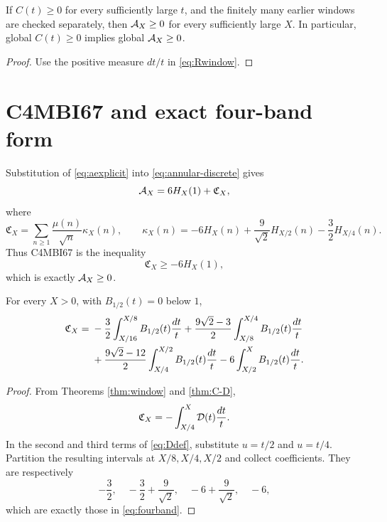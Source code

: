 \begin{corollary}\label{cor:pointwise}
If $C(t)\ge0$ for every sufficiently large $t$, and the finitely many earlier
windows are checked separately, then $\mathcal A_X\ge0$ for every sufficiently large
$X$.  In particular, global $C(t)\ge0$ implies global $\mathcal A_X\ge0$.
\end{corollary}
\begin{proof}
Use the positive measure $dt/t$ in \eqref{eq:Rwindow}.
\end{proof}

\section{C4MBI67 and exact four-band form}

Substitution of \eqref{eq:aexplicit} into \eqref{eq:annular-discrete} gives
\begin{equation}\label{eq:kappa}
 \mathcal A_X=6H_X(1)+\mathfrak C_X,
\end{equation}
where
\[
 \mathfrak C_X=\sum_{n\ge1}\frac{\mu(n)}{\sqrt n}\kappa_X(n),
\qquad
 \kappa_X(n)=-6H_X(n)+\frac9{\sqrt2}H_{X/2}(n)
                         -\frac32H_{X/4}(n).
\]
Thus C4MBI67 is the inequality
\begin{equation}\label{eq:c4mbi}
 \mathfrak C_X\ge-6H_X(1),
\end{equation}
which is exactly $\mathcal A_X\ge0$.

\begin{theorem}\label{thm:fourband}
For every $X>0$, with $B_{1/2}(t)=0$ below $1$,
\begin{align}
\mathfrak C_X={}&-\frac32\int_{X/16}^{X/8}B_{1/2}(t)\frac{dt}{t}
+\frac{9\sqrt2-3}{2}\int_{X/8}^{X/4}B_{1/2}(t)\frac{dt}{t}\notag\\
&+\frac{9\sqrt2-12}{2}\int_{X/4}^{X/2}B_{1/2}(t)\frac{dt}{t}
-6\int_{X/2}^{X}B_{1/2}(t)\frac{dt}{t}.\label{eq:fourband}
\end{align}
\end{theorem}
\begin{proof}
From Theorems \ref{thm:window} and \ref{thm:C-D},
\[
 \mathfrak C_X=-\int_{X/4}^{X}\mathcal D(t)\frac{dt}{t}.
\]
In the second and third terms of \eqref{eq:Ddef}, substitute $u=t/2$ and
$u=t/4$.  Partition the resulting intervals at
$X/8,X/4,X/2$ and collect coefficients.  They are respectively
\[
 -\frac32,\quad -\frac32+\frac9{\sqrt2},\quad
 -6+\frac9{\sqrt2},\quad -6,
\]
which are exactly those in \eqref{eq:fourband}.
\end{proof}

